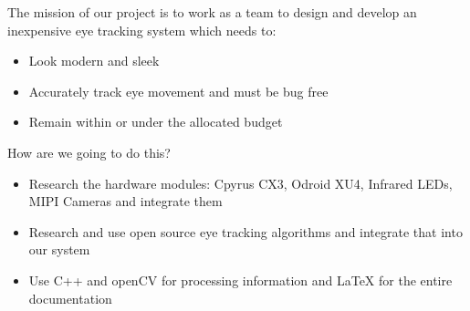 The mission of our project is to work as a team to design and develop an inexpensive eye tracking system which needs to:
\begin{itemize}
\item Look modern and sleek
\item Accurately track eye movement and must be bug free
\item Remain within or under the allocated budget 
\end{itemize}
How are we going to do this?
\begin{itemize}
\item Research the hardware modules: Cpyrus CX3, Odroid XU4, Infrared LEDs, MIPI Cameras and integrate them
\item Research and use open source eye tracking algorithms and integrate that into our system
\item Use C++ and openCV for processing information and LaTeX for the entire documentation
\end{itemize}
